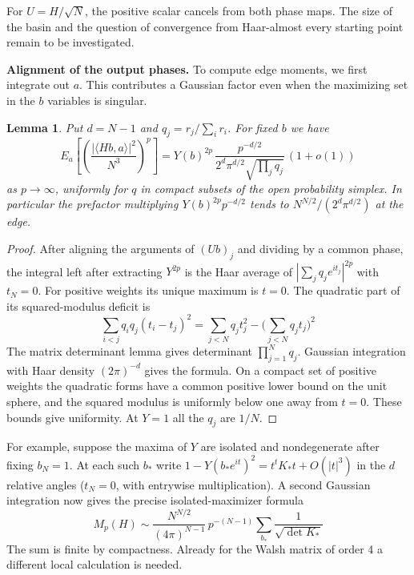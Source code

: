 \documentclass[11pt,a4paper]{article}
\newtheorem{lem}[thm]{Lemma}
\theoremstyle{remark}
\begin{document}
For $U=H/\sqrt N$, the positive scalar cancels from both phase maps.
The size of the basin and the question of convergence from Haar-almost
every starting point remain to be investigated.

\medskip
\noindent\textbf{Alignment of the output phases.}
To compute edge moments, we first integrate out $a$. This contributes a
Gaussian factor even when the maximizing set in the $b$ variables is singular.

\begin{samepage}
\begin{lem}\label{lem:edge-align}
Put $d=N-1$ and $q_j=r_j/\sum_i r_i$. For fixed $b$ we have
\[
 E_a\left[\left(\frac{|\langle Hb,a\rangle|^2}{N^3}\right)^p\right]
 =Y(b)^{2p}\,\frac{p^{-d/2}}{2^d\pi^{d/2}\sqrt{\prod_j q_j}}\,(1+o(1))
\]
as $p\to\infty$, uniformly for $q$ in compact subsets of the open
probability simplex. In particular the prefactor multiplying
$Y(b)^{2p}p^{-d/2}$ tends to $N^{N/2}/(2^d\pi^{d/2})$ at the edge.
\end{lem}
\end{samepage}
\begin{proof}
After aligning the arguments of $(Ub)_j$ and dividing by a common
phase, the integral left after extracting $Y^{2p}$ is the Haar average
of $|\sum_jq_j e^{it_j}|^{2p}$ with $t_N=0$. For positive weights its
unique maximum is $t=0$. The quadratic part of its squared-modulus
deficit is
\[
 \sum_{i<j}q_iq_j(t_i-t_j)^2
  =\sum_{j<N}q_jt_j^2-\Big(\sum_{j<N}q_jt_j\Big)^2
\]
The matrix determinant lemma gives determinant $\prod_{j=1}^N q_j$.
Gaussian integration with Haar density $(2\pi)^{-d}$ gives the formula.
On a compact set of positive weights the quadratic forms have a common
positive lower bound on the unit sphere, and the squared modulus is
uniformly below one away from $t=0$. These bounds give uniformity.
At $Y=1$ all the $q_j$ are $1/N$.
\end{proof}

For example, suppose the maxima of $Y$ are isolated and nondegenerate
after fixing $b_N=1$. At each such $b_*$ write
$1-Y(b_*e^{it})^2=t^t K_* t+O(|t|^3)$ in the $d$ relative angles
($t_N=0$, with entrywise multiplication). A second Gaussian integration
now gives the precise isolated-maximizer formula
\[
 M_p(H)\sim \frac{N^{N/2}}{(4\pi)^{N-1}}\,
 p^{-(N-1)}\sum_{b_*}\frac{1}{\sqrt{\det K_*}}
\]
The sum is finite by compactness. Already for the Walsh matrix of order
4 a different local calculation is needed.
\end{document}
